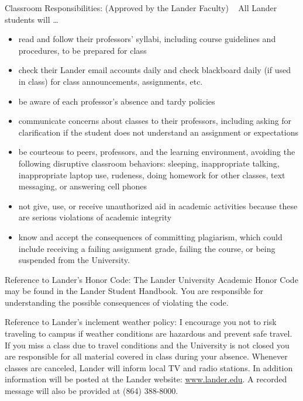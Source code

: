 \documentclass{article}
\begin{document}
\item[Classroom Responsibilities: (Approved by the Lander Faculty)]\ \newline
  All Lander students will \dots
  \begin{itemize}
    \item read and follow their professors' syllabi, including course guidelines and procedures, to be prepared for class
    \item check their Lander email accounts daily and check blackboard daily (if used in class) for class announcements, assignments, etc.
    \item be aware of each professor’s absence and tardy policies
    \item communicate concerns about classes to their professors, including asking for clarification if the student does not understand an assignment or expectations
    \item be courteous to peers, professors, and the learning environment, avoiding the following disruptive classroom behaviors: sleeping, inappropriate talking, inappropriate laptop use, rudeness, doing homework for other classes, text messaging, or answering cell phones
    \item not give, use, or receive unauthorized aid in academic activities because these are serious violations of academic integrity
    \item know and accept the consequences of committing plagiarism, which could include receiving a failing assignment grade, failing the course, or being suspended from the University.
  \end{itemize}

\item[Reference to Lander’s Honor Code:]
  The Lander University Academic Honor Code may be found in the Lander Student Handbook. You are responsible for understanding the possible consequences of violating the code.

\item[Reference to Lander’s inclement weather policy:]
  I encourage you not to risk traveling to campus if weather conditions are hazardous and prevent safe travel. If you miss a class due to travel conditions and the University is not closed you are responsible for all material covered in class during your absence. Whenever classes are canceled, Lander will inform local TV and radio stations. In addition information will be posted at the Lander website: \href{www.lander.edu}{www.lander.edu}. A recorded message will also be provided at (864) 388-8000.
\end{document}
